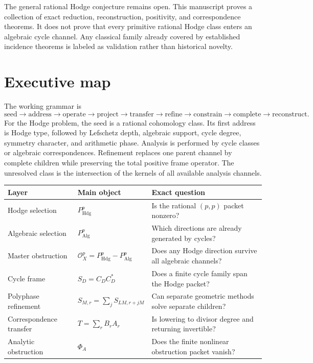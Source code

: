 \documentclass[11pt,oneside]{book}
\theoremstyle{definition}
\theoremstyle{remark}
\newcommand{\Hdg}{\operatorname{Hdg}}
\newcommand{\Alg}{\operatorname{Alg}}
\begin{document}
\begin{claimboundary}
The general rational Hodge conjecture remains open. This manuscript proves a collection of exact reduction, reconstruction, positivity, and correspondence theorems. It does not prove that every primitive rational Hodge class enters an algebraic cycle channel. Any classical family already covered by established incidence theorems is labeled as validation rather than historical novelty.
\end{claimboundary}

\chapter*{Executive map}
The working grammar is
\[
\text{seed}\to\text{address}\to\text{operate}\to\text{project}
\to\text{transfer}\to\text{refine}\to\text{constrain}
\to\text{complete}\to\text{reconstruct}.
\]
For the Hodge problem, the seed is a rational cohomology class. Its first address is Hodge type, followed by Lefschetz depth, algebraic support, cycle degree, symmetry character, and arithmetic phase. Analysis is performed by cycle classes or algebraic correspondences. Refinement replaces one parent channel by complete children while preserving the total positive frame operator. The unresolved class is the intersection of the kernels of all available analysis channels.

\begin{center}
\begin{tabular}{p{}p{}p{}}
\toprule
Layer & Main object & Exact question \\
\midrule
Hodge selection & $P_{\Hdg}^p$ & Is the rational $(p,p)$ packet nonzero? \\
Algebraic selection & $P_{\Alg}^p$ & Which directions are already generated by cycles? \\
Master obstruction & $\mathcal O_X^p=P_{\Hdg}^p-P_{\Alg}^p$ & Does any Hodge direction survive all algebraic channels? \\
Cycle frame & $S_D=C_DC_D^*$ & Does a finite cycle family span the Hodge packet? \\
Polyphase refinement & $S_{M,r}=\sum_j S_{LM,r+jM}$ & Can separate geometric methods solve separate children? \\
Correspondence transfer & $T=\sum_rB_rA_r$ & Is lowering to divisor degree and returning invertible? \\
Analytic obstruction & $\Phi_A$ & Does the finite nonlinear obstruction packet vanish? \\
\bottomrule
\end{tabular}
\end{center}
\end{document}

